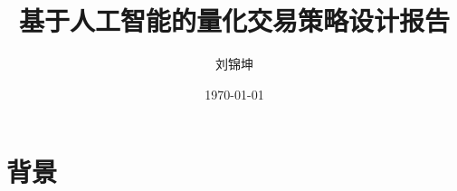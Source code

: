 \documentclass{article}
\title{基于人工智能的量化交易策略设计报告}
\author{刘锦坤}
\date{\today}
\begin{document}
\maketitle

\section{背景}
\end{document}
